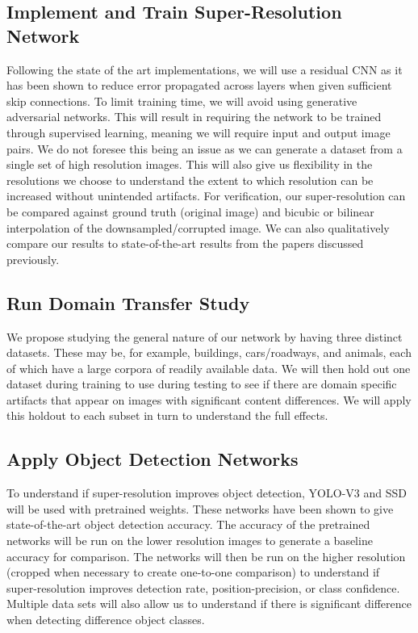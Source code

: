 \documentclass{article}
\begin{document}
\subsection{Implement and Train Super-Resolution Network}
Following the state of the art implementations, we will use a residual CNN as it has been shown to reduce error propagated across layers when given sufficient skip connections. To limit training time, we will avoid using generative adversarial networks. This will result in requiring the network to be trained through supervised learning, meaning we will require input and output image pairs. We do not foresee this being an issue as we can generate a dataset from a single set of high resolution images. This will also give us flexibility in the resolutions we choose to understand the extent to which resolution can be increased without unintended artifacts. For verification, our super-resolution can be compared against ground truth (original image) and bicubic or bilinear interpolation of the downsampled/corrupted image. We can also qualitatively compare our results to state-of-the-art results from the papers discussed previously.

\subsection{Run Domain Transfer Study}
We propose studying the general nature of our network by having three distinct datasets. These may be, for example, buildings, cars/roadways, and animals, each of which have a large corpora of readily available data. We will then hold out one dataset during training to use during testing to see if there are domain specific artifacts that appear on images with significant content differences. We will apply this holdout to each subset in turn to understand the full effects.


\subsection{Apply Object Detection Networks}
To understand if super-resolution improves object detection, YOLO-V3 and SSD will be used with pretrained weights. These networks have been shown to give state-of-the-art object detection accuracy. The accuracy of the pretrained networks will be run on the lower resolution images to generate a baseline accuracy for comparison. The networks will then be run on the higher resolution (cropped when necessary to create one-to-one comparison) to understand if super-resolution improves detection rate, position-precision, or class confidence. Multiple data sets will also allow us to understand if there is significant difference when detecting difference object classes.
\end{document}
